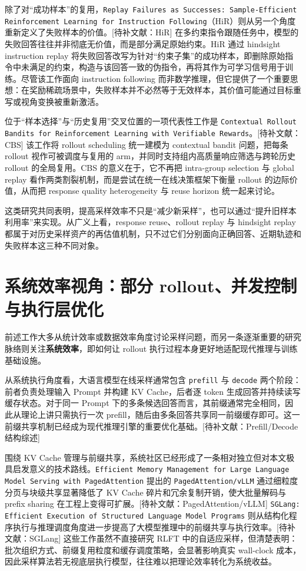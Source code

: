 除了对“成功样本”的复用，\texttt{Replay Failures as Successes: Sample-Efficient Reinforcement Learning for Instruction Following}（HiR）则从另一个角度重新定义了失败样本的价值。[待补文献：HiR] 在多约束指令跟随任务中，模型的失败回答往往并非彻底无价值，而是部分满足原始约束。HiR 通过 hindsight instruction replay 将失败回答改写为针对“约束子集”的成功样本，即删除原始指令中未满足的约束，构造与该回答一致的伪指令，再将其作为可学习信号用于训练。尽管该工作面向 instruction following 而非数学推理，但它提供了一个重要思想：在奖励稀疏场景中，失败样本并不必然等于无效样本，其价值可能通过目标重写或视角变换被重新激活。

位于“样本选择”与“历史复用”交叉位置的一项代表性工作是 \texttt{Contextual Rollout Bandits for Reinforcement Learning with Verifiable Rewards}。[待补文献：CBS] 该工作将 rollout scheduling 统一建模为 contextual bandit 问题，把每条 rollout 视作可被调度与复用的 arm，并同时支持组内高质量响应筛选与跨轮历史 rollout 的全局复用。CBS 的意义在于，它不再把 intra-group selection 与 global replay 看作两类割裂机制，而是尝试在统一在线决策框架下衡量 rollout 的边际价值，从而把 response quality heterogeneity 与 reuse horizon 统一起来讨论。

这类研究共同表明，提高采样效率不只是“减少新采样”，也可以通过“提升旧样本利用率”来实现。从广义上看，response reuse、rollout replay 与 hindsight replay 都属于对历史采样资产的再估值机制，只不过它们分别面向正确回答、近期轨迹和失败样本这三种不同对象。

\section{系统效率视角：部分 rollout、并发控制与执行层优化}

前述工作大多从统计效率或数据效率角度讨论采样问题，而另一条逐渐重要的研究脉络则关注\textbf{系统效率}，即如何让 rollout 执行过程本身更好地适配现代推理与训练基础设施。

从系统执行角度看，大语言模型在线采样通常包含 \texttt{prefill} 与 \texttt{decode} 两个阶段：前者负责处理输入 Prompt 并构建 KV Cache，后者逐 token 生成回答并持续读写缓存状态。对于同一 Prompt 下的多条候选回答而言，其前缀通常完全相同，因此从理论上讲只需执行一次 prefill，随后由多条回答共享同一前缀缓存即可。这一前缀共享机制已经成为现代推理引擎的重要优化基础。[待补文献：Prefill/Decode 结构综述]

围绕 KV Cache 管理与前缀共享，系统社区已经形成了一条相对独立但对本文极具启发意义的技术路线。\texttt{Efficient Memory Management for Large Language Model Serving with PagedAttention} 提出的 \texttt{PagedAttention/vLLM} 通过细粒度分页与块级共享显著降低了 KV Cache 碎片和冗余复制开销，使大批量解码与 prefix sharing 在工程上变得可扩展。[待补文献：PagedAttention/vLLM] \texttt{SGLang: Efficient Execution of Structured Language Model Programs} 则从结构化程序执行与推理调度角度进一步提高了大模型推理中的前缀共享与执行效率。[待补文献：SGLang] 这些工作虽然不直接研究 RLFT 中的自适应采样，但清楚表明：批次组织方式、前缀复用粒度和缓存调度策略，会显著影响真实 wall-clock 成本，因此采样算法若无视底层执行模型，往往难以把理论效率转化为系统收益。

